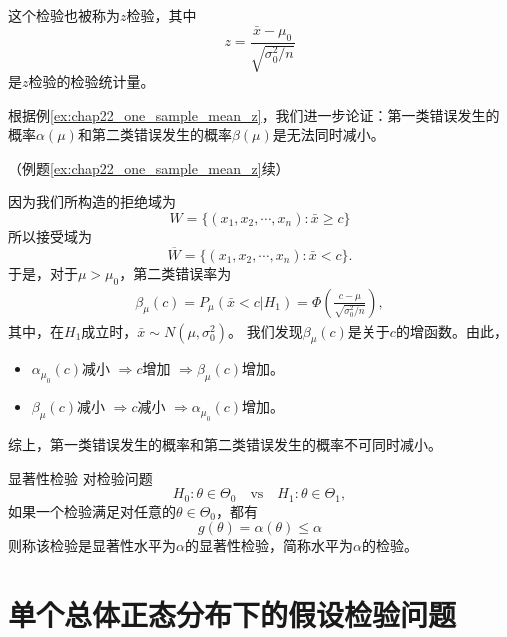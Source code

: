 \begin{remark}
    这个检验也被称为$z$检验，其中$$
    z = \frac{\bar{x}-\mu_0}{\sqrt{\sigma_0^2/n}}
    $$
    是$z$检验的检验统计量。
\end{remark}
\newpage
根据例\ref{ex:chap22_one_sample_mean_z}，我们进一步论证：第一类错误发生的概率$\alpha(\mu)$和第二类错误发生的概率$\beta(\mu)$是无法同时减小。
\begin{example}{（例题\ref{ex:chap22_one_sample_mean_z}续）}

    因为我们所构造的拒绝域为$$W = \{(x_1,x_2,\cdots,x_n): \bar{x} \geq  c\} $$
    所以接受域为$$\overline{W} = \{(x_1,x_2,\cdots,x_n): \bar{x} <  c\} .$$
    于是，对于$\mu > \mu_0$，第二类错误率为
    \begin{eqnarray*}
    \beta_{\mu}(c) =   P_{\mu}\left( \bar{x} < c|H_1\right) 
 = \Phi\left(\frac{c-\mu}{\sqrt{\sigma_0^2/n}}\right),
    \end{eqnarray*}
    其中，在$H_1$成立时，$\bar{x}\sim N(\mu,\sigma_0^2)$。
    我们发现$\beta_{\mu}(c)$是关于$c$的增函数。由此，
    \begin{itemize}
        \item $\alpha_{\mu_0}(c)$减小 $\Rightarrow c$增加 $\Rightarrow \beta_{\mu}(c)$增加。
        \item $\beta_{\mu}(c)$减小 $\Rightarrow c$减小 $\Rightarrow \alpha_{\mu_0}(c)$增加。
    \end{itemize}
   综上，第一类错误发生的概率和第二类错误发生的概率不可同时减小。
\end{example}

\begin{definition}{显著性检验}
    对检验问题$$
H_0: \theta\in \Theta_0 \quad \text{vs} \quad H_1: \theta\in\Theta_1,
    $$
    如果一个检验满足对任意的$\theta\in\Theta_0$，都有
    $$
    g(\theta) = \alpha(\theta) \leq \alpha
    $$
    则称该检验是显著性水平为$\alpha$的显著性检验，简称水平为$\alpha$的检验。
\end{definition}

\section{单个总体正态分布下的假设检验问题}
